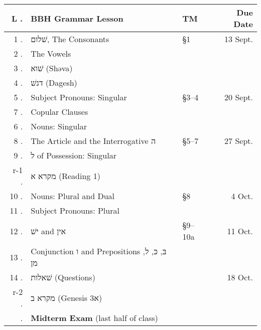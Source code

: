 \documentclass[titlepage]{article}
\begin{document}
\begin{table}[htbp]%
  \centering%
  \begin{tabular}{@{}r<{.}@{ }llr}
    \toprule
    \bfseries L & \textbf{BBH Grammar Lesson} & \textbf{TM} & \textbf{Due Date} \\
    \midrule
    1   & \texthebrew{שׁלום}, The Consonants                          & \S1   & 13 Sept. \\
    2   & The Vowels                                                 & & \\
    3   & \texthebrew{שׁוא} (Shəva)                                   & & \\
    4   & \texthebrew{דגשׁ} (Dagesh)                                  & & \\ [1ex]
    5   & Subject Pronouns: Singular                                 & \S3–4 & 20 Sept. \\
    7   & Copular Clauses                                            & & \\
    6   & Nouns: Singular                                            & & \\ [1ex]
    8   & The Article and the Interrogative \texthebrew{ה}           & \S5–7 & 27 Sept. \\
    9   & \texthebrew{ל} of Possession: Singular                     & & \\
    r-1 & \texthebrew{מקרא א} (Reading 1)                            & & \\ [1ex]
    10  & Nouns: Plural and Dual                                     & \S8   & 4 Oct. \\
    11  & Subject Pronouns: Plural                                   & & \\ [1ex]
    12  & \texthebrew{ישׁ} and \texthebrew{אין}                        & \S9–10a & 11 Oct. \\
    13  & Conjunction \texthebrew{ו} and Prepositions \texthebrew{בּ},
         \texthebrew{כּ}, \texthebrew{ל}, \texthebrew{מן}                & & \\ [1ex]
    14  & \texthebrew{שׁאלות} (Questions)                             & & 18 Oct. \\
    r-2 & \texthebrew{מקרא ב} (Genesis 3\texthebrew{א})              & & \\
    \sessionskip{\rarr} & \textbf{Midterm Exam} (last half of class) & & \\ [1ex]

\end{tabular}
\end{table}
\end{document}
